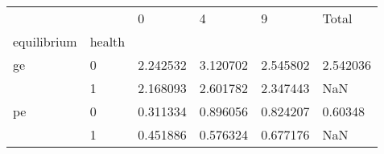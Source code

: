 \begin{tabular}{llllll}
\toprule
   &   &         0 &         4 &         9 &     Total \\
equilibrium & health &           &           &           &           \\
\midrule
ge & 0 &  2.242532 &  3.120702 &  2.545802 &  2.542036 \\
   & 1 &  2.168093 &  2.601782 &  2.347443 &       NaN \\
pe & 0 &  0.311334 &  0.896056 &  0.824207 &   0.60348 \\
   & 1 &  0.451886 &  0.576324 &  0.677176 &       NaN \\
\bottomrule
\end{tabular}
